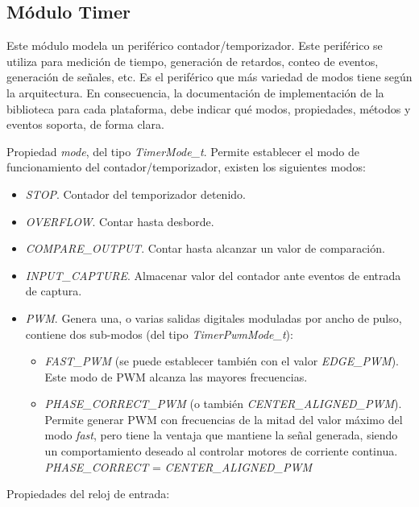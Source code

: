 \subsection{Módulo Timer}

Este módulo modela un periférico contador/temporizador. Este periférico se utiliza para medición de tiempo, generación de retardos, conteo de eventos, generación de señales, etc. Es el periférico que más variedad de modos tiene según la arquitectura. En consecuencia, la documentación de implementación de la biblioteca para cada plataforma, debe indicar qué modos, propiedades, métodos y eventos soporta, de forma clara.


Propiedad \emph{mode}, del tipo \emph{TimerMode\_t}. Permite establecer el modo de funcionamiento del contador/temporizador, existen los siguientes modos:

\begin{itemize}
\item
\emph{STOP}. Contador del temporizador detenido.
\item
\emph{OVERFLOW}. Contar hasta desborde.
\item
\emph{COMPARE\_OUTPUT}. Contar hasta alcanzar un valor de comparación.
\item
\emph{INPUT\_CAPTURE}. Almacenar valor del contador ante eventos de entrada de captura.
\item
\emph{PWM}. Genera una, o varias salidas digitales moduladas por ancho de pulso, contiene dos sub-modos (del tipo \emph{TimerPwmMode\_t}):
\begin{itemize}
\item
\emph{FAST\_PWM} (se puede establecer también con el valor \emph{EDGE\_PWM}). Este modo de PWM alcanza las mayores frecuencias. 
\item
\emph{PHASE\_CORRECT\_PWM} (o también \emph{CENTER\_ALIGNED\_PWM}). Permite generar PWM con frecuencias de la mitad del valor máximo del modo \emph{fast}, pero tiene la ventaja que  mantiene la señal generada, siendo un comportamiento deseado al controlar motores de corriente continua.
\emph{PHASE\_CORRECT} = \emph{CENTER\_ALIGNED\_PWM}
\end{itemize}
\end{itemize}

Propiedades del reloj de entrada:

